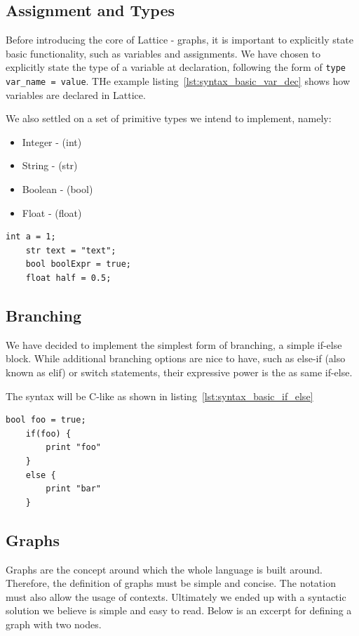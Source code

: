 \subsection{Assignment and Types}\label{subsec:syntax_assignment_and_types}
Before introducing the core of Lattice - graphs, it is important to explicitly state basic functionality,
such as variables and assignments.
We have chosen to explicitly state the type of a variable at declaration,
following the form of \lstinline{type var_name = value}.
THe example listing~\ref{lst:syntax_basic_var_dec} shows how variables are declared in Lattice.

We also settled on a set of primitive types we intend to implement, namely:
\begin{itemize}
    \item Integer - (int)
    \item String - (str)
    \item Boolean - (bool)
    \item Float - (float)
\end{itemize}

\begin{lstlisting}[caption={Basic variable declaration.},captionpos=b,label={lst:syntax_basic_var_dec}]
    int a = 1;
    str text = "text";
    bool boolExpr = true;
    float half = 0.5;
\end{lstlisting}



\subsection{Branching}\label{subsec:syntax_branching}
We have decided to implement the simplest form of branching, a simple if-else block.
While additional branching options are nice to have, such as else-if (also known as elif) or switch statements, their
expressive power is the as same if-else.

The syntax will be C-like as shown in listing~\ref{lst:syntax_basic_if_else}
\begin{lstlisting}[caption={Simple branching example.},captionpos=b,label={lst:syntax_basic_if_else}]
    bool foo = true;
    if(foo) {
        print "foo"
    }
    else {
        print "bar"
    }
\end{lstlisting}

\subsection{Graphs}\label{subsec:syntax_graphs}
Graphs are the concept around which the whole language is built around.
Therefore, the definition of graphs
must be simple and concise.
The notation must also allow the usage of contexts.
Ultimately we ended up with a syntactic solution we believe is simple and easy to read.
Below is an excerpt for
defining a graph with two nodes.

